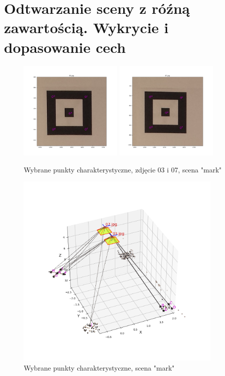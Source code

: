 \section{Odtwarzanie sceny z róźną zawartością. Wykrycie i dopasowanie cech}
\begin{figure}[h]
   \centering
   \includegraphics[width=5cm]{feature_mark/03.png}
   \includegraphics[width=5cm]{feature_mark/07.png}
   \caption{Wybrane punkty charakterystyczne, zdjęcie 03 i 07, scena "mark"}
   \label {fig:feature_mark_03_07}
\end{figure}

\begin{figure}[h]
   \centering
   \includegraphics[width=10cm]{feature_mark/scene.png}
   \caption{Wybrane punkty charakterystyczne, scena "mark"}
   \label {fig:feature_mark_plot}
\end{figure}

